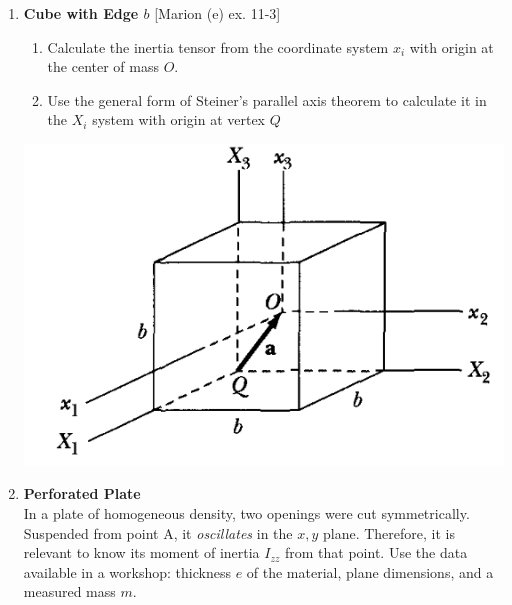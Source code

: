 \documentclass[11pt, a4paper, twoside]{article}
\begin{document}
\begin{enumerate}
	\item 
	\begin{minipage}[t][4.5cm]{0.55\textwidth}
			\textbf{Cube with Edge \(b\)} [Marion (e) ex. 11-3]
			\begin{enumerate}
				\item Calculate the inertia tensor from the coordinate system \(x_i\) with origin at the center of mass \(O\).
				\item Use the general form of Steiner's parallel axis theorem to calculate it in the \(X_i\) system with origin at vertex \(Q\) 
			\end{enumerate}
		\end{minipage}
		\begin{minipage}[c][1cm][t]{0.4\textwidth}
			\includegraphics[width=\textwidth]{figures/mFig11-8}
		\end{minipage}


	\item 
		\begin{minipage}[t][4cm]{0.49\textwidth}
			\textbf{Perforated Plate}\\
			In a plate of homogeneous density, two openings were cut symmetrically. Suspended from point A, it \emph{oscillates} in the \(x,y\) plane. Therefore, it is relevant to know its moment of inertia \(I_{zz}\) from that point. Use the data available in a workshop: thickness $e$ of the material, plane dimensions, and a measured mass $m$. 


\end{minipage}
\end{enumerate}
\end{document}
